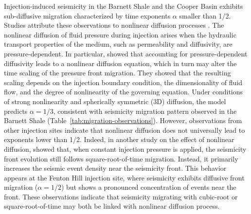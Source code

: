 \documentclass[draft]{agujournal2019}
\begin{document}

Injection-induced seismicity in the Barnett Shale and the Cooper Basin exhibits sub-diffusive migration characterized by time exponents $\alpha$ smaller than 1/2. Studies attribute these observations to nonlinear diffusion processes \cite{ShapiroDinske2009, JohannEtAl2016}. The nonlinear diffusion of fluid pressure during injection arises when the hydraulic transport properties of the medium, such as permeability and diffusivity, are pressure-dependent. In particular,  showed that accounting for pressure-dependent diffusivity leads to a nonlinear diffusion equation, which in turn may alter the time scaling of the pressure front migration. They showed that the resulting scaling depends on the injection boundary condition, the dimensionality of fluid flow, and the degree of nonlinearity of the governing equation. Under conditions of strong nonlinearity and spherically symmetric (3D) diffusion, the model predicts $\alpha=1/3$, consistent with seismicity migration pattern observed in the Barnett Shale (Table~\ref{tab:migration-observations}).  However, observations from other injection sites indicate that nonlinear diffusion does not universally lead to exponents lower than 1/2. Indeed, in another study on the effect of nonlinear diffusion,  showed that, when constant injection pressure is applied, the seismicity front evolution still follows square-root-of-time migration. Instead, it primarily increases the seismic event density near the seismicity front. This behavior appears at the Fenton Hill injection site, where seismicity exhibits diffusive front migration ($\alpha=1 / 2$) but shows a pronounced concentration of events near the front. These observations indicate that seismicity migrating with cubic-root or square-root-of-time may both be linked with nonlinear diffusion process.

\end{document}
